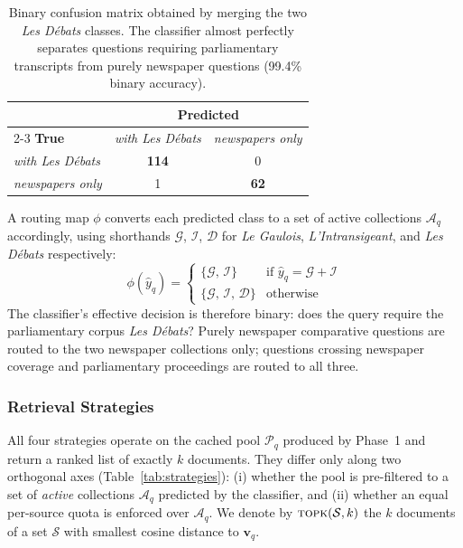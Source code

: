 \begin{table}[htbp]
\centering
\small
\begin{tabular}{l cc}
\toprule
 & \multicolumn{2}{c}{\textbf{Predicted}} \\
\cmidrule(lr){2-3}
\textbf{True}  & \textit{with Les Débats} & \textit{newspapers only} \\
\midrule
\textit{with Les Débats}  & \textbf{114} &   0 \\
\textit{newspapers only}  &    1 & \textbf{62} \\
\bottomrule
\end{tabular}
\caption{Binary confusion matrix obtained by merging the two \textit{Les Débats}
classes. The classifier almost perfectly separates questions requiring
parliamentary transcripts from purely newspaper questions (99.4\% binary accuracy).}
\label{tab:confusion-binary}
\end{table}

A routing map $\phi$ converts each predicted class to a set of active collections
$\mathcal{A}_q$ accordingly, using shorthands $\mathcal{G}$, $\mathcal{I}$,
$\mathcal{D}$ for \textit{Le Gaulois}, \textit{L'Intransigeant}, and
\textit{Les Débats} respectively:
%
\begin{equation}
  \label{eq:routing}
  \phi(\hat{y}_q) =
  \begin{cases}
    \{\mathcal{G},\, \mathcal{I}\}
      & \text{if } \hat{y}_q = \mathcal{G} + \mathcal{I} \\[4pt]
    \{\mathcal{G},\, \mathcal{I},\, \mathcal{D}\}
      & \text{otherwise}
  \end{cases}
\end{equation}
%
The classifier's effective decision is therefore binary: does the query require
the parliamentary corpus \textit{Les Débats}? Purely newspaper comparative
questions are routed to the two newspaper collections only; questions crossing
newspaper coverage and parliamentary proceedings are routed to all three.

\subsubsection{Retrieval Strategies}
\label{sec:retrieval-strategies}

All four strategies operate on the cached pool $\mathcal{P}_q$ produced by
Phase~1 and return a ranked list of exactly $k$ documents.
They differ only along two orthogonal axes (Table~\ref{tab:strategies}):
(i) whether the pool is pre-filtered to a set of \emph{active} collections
$\mathcal{A}_q$ predicted by the classifier, and (ii) whether an equal
per-source quota is enforced over $\mathcal{A}_q$.
We denote by $\textsc{topk}(\mathcal{S}, k)$ the $k$ documents of a set
$\mathcal{S}$ with smallest cosine distance to $\mathbf{v}_q$.

